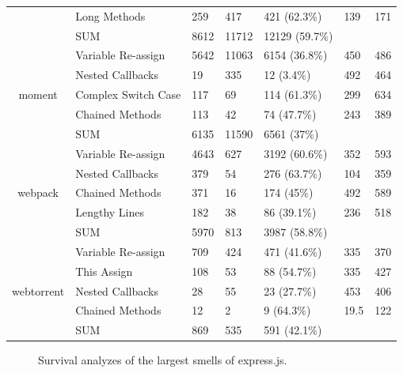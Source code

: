 {\begin{table}[!htbp]
{\begin{tabular}{c|l|l|l|m{2cm}|m{2cm}|m{2cm}}
		& Long Methods & 259 & 417 & 421 (62.3\%) & 139 & 171 \\ \cline{2-7}
		& SUM & 8612 & 11712 & 12129 (59.7\%) & & \\ \hline
		\multirow{5}{*}{moment}
		& Variable Re-assign & 5642 & 11063 & 6154 (36.8\%) & 450 & 486 \\ \cline{2-7}
		& Nested Callbacks & 19 & 335 & 12 (3.4\%) & 492 & 464 \\ \cline{2-7}
		& Complex Switch Case & 117 & 69 & 114 (61.3\%) & 299 & 634 \\ \cline{2-7}
		& Chained Methods & 113 & 42 & 74 (47.7\%) & 243 & 389 \\ \cline{2-7}
		& SUM & 6135 & 11590 & 6561 (37\%) & & \\ \hline
		\multirow{5}{*}{webpack}
		& Variable Re-assign & 4643 & 627 & 3192 (60.6\%) & 352 & 593 \\ \cline{2-7}
		& Nested Callbacks & 379 & 54 & 276 (63.7\%) & 104 & 359 \\ \cline{2-7}
		& Chained Methods & 371 & 16 & 174 (45\%) & 492 & 589 \\ \cline{2-7}
		& Lengthy Lines & 182 & 38 & 86 (39.1\%) & 236 & 518 \\ \cline{2-7}
		& SUM & 5970 & 813 & 3987 (58.8\%) & & \\ \hline
		\multirow{5}{*}{webtorrent}
		& Variable Re-assign & 709 & 424 & 471 (41.6\%) & 335 & 370 \\ \cline{2-7}
		& This Assign & 108 & 53 & 88 (54.7\%) & 335 & 427 \\ \cline{2-7}
		& Nested Callbacks & 28 & 55 & 23 (27.7\%) & 453 & 406 \\ \cline{2-7}
		& Chained Methods & 12 & 2 & 9 (64.3\%) & 19.5 & 122 \\ \cline{2-7}
		& SUM & 869 & 535 & 591 (42.1\%) & & \\ \hline
	\end{tabular}
}
	\label{survivalsmells}
\end{table}

\begin{figure}[!htbp]
	\centering%
	\caption{Survival analyzes of the largest smells of express.js.\vspace{-10pt}}
	\label{survivalplots1}
\end{figure}

}

